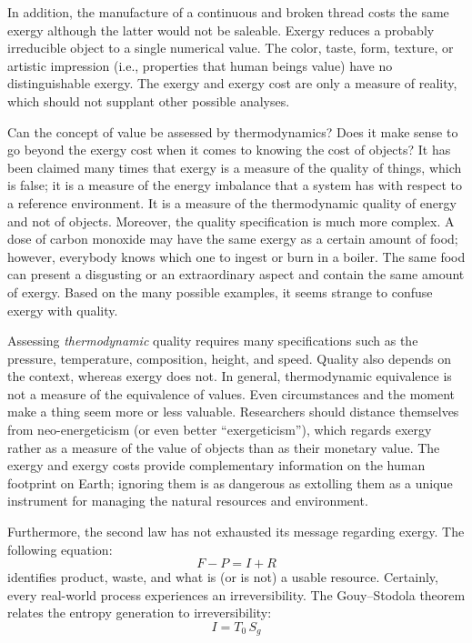 \documentclass[energies,article,submit,moreauthors,pdftex]{Definitions/mdpi}
\begin{document}
In addition, the manufacture of a continuous and broken thread costs the same exergy although the latter would not be saleable. Exergy reduces a probably irreducible object to a single numerical value. The color, taste, form, texture, or artistic impression (i.e., properties that human beings value) have no distinguishable exergy. The exergy and exergy cost are only a measure of reality, which should not supplant other possible analyses.

Can the concept of value be assessed by thermodynamics? Does it make sense to go beyond the exergy cost when it comes to knowing the cost of objects? It has been claimed many times that exergy is a measure of the quality of things, which is false; it is a measure of the energy imbalance that a system has with respect to a reference environment. It is a measure of the thermodynamic quality of energy and not of objects. Moreover, the quality specification is much more complex. A dose of carbon monoxide may have the same exergy as a certain amount of food; however, everybody knows which one to ingest or burn in a boiler. The same food can present a disgusting or an extraordinary aspect and contain the same amount of exergy. Based on the many possible examples, it seems strange to confuse exergy with quality.

Assessing \emph{thermodynamic} quality requires many specifications such as the pressure, temperature, composition, height, and speed. Quality also depends on the context, whereas exergy does not. In general, thermodynamic equivalence is not a measure of the equivalence of values. Even circumstances and the moment make a thing seem more or less valuable. Researchers should distance themselves from neo-energeticism (or even better “exergeticism”), which regards exergy rather as a measure of the value of objects than as their monetary value. The exergy and exergy costs provide complementary information on the human footprint on Earth; ignoring them is as dangerous as extolling them as a unique instrument for managing the natural resources and environment.
 
Furthermore, the second law has not exhausted its message regarding exergy. The following equation:
\begin{equation}
   F - P = I + R
\label{eq:FPR}
\end{equation}
identifies product, waste, and what is (or is not) a usable resource. Certainly, every real-world process experiences an irreversibility. The Gouy–Stodola theorem relates the entropy generation to irreversibility:
\begin{equation}
    I = T_0\,S_g
\label{eq:gouystodola}
\end{equation}
\end{document}
